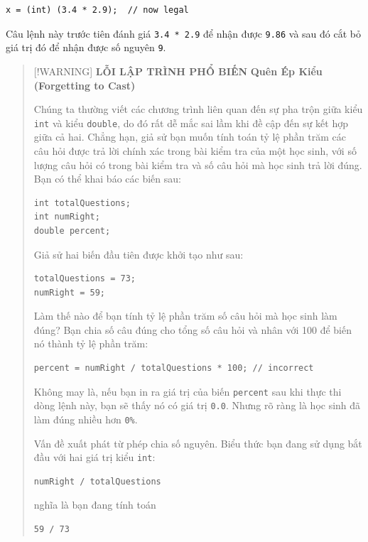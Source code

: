\begin{verbatim}
x = (int) (3.4 * 2.9);  // now legal
\end{verbatim}

Câu lệnh này trước tiên đánh giá \texttt{3.4\ *\ 2.9} để nhận được
\texttt{9.86} và sau đó cắt bỏ giá trị đó để nhận được số nguyên
\texttt{9}.

\begin{quote}
{[}!WARNING{]} \textbf{LỖI LẬP TRÌNH PHỔ BIẾN} \textbf{Quên Ép Kiểu
(Forgetting to Cast)}

Chúng ta thường viết các chương trình liên quan đến sự pha trộn giữa
kiểu \texttt{int} và kiểu \texttt{double}, do đó rất dễ mắc sai lầm khi
đề cập đến sự kết hợp giữa cả hai. Chẳng hạn, giả sử bạn muốn tính toán
tỷ lệ phần trăm các câu hỏi được trả lời chính xác trong bài kiểm tra
của một học sinh, với số lượng câu hỏi có trong bài kiểm tra và số câu
hỏi mà học sinh trả lời đúng. Bạn có thể khai báo các biến sau:

\begin{verbatim}
int totalQuestions;
int numRight;
double percent;
\end{verbatim}

Giả sử hai biến đầu tiên được khởi tạo như sau:

\begin{verbatim}
totalQuestions = 73;
numRight = 59;
\end{verbatim}

Làm thế nào để bạn tính tỷ lệ phần trăm số câu hỏi mà học sinh làm đúng?
Bạn chia số câu đúng cho tổng số câu hỏi và nhân với 100 để biến nó
thành tỷ lệ phần trăm:

\begin{verbatim}
percent = numRight / totalQuestions * 100; // incorrect
\end{verbatim}

Không may là, nếu bạn in ra giá trị của biến \texttt{percent} sau khi
thực thi dòng lệnh này, bạn sẽ thấy nó có giá trị \texttt{0.0}. Nhưng rõ
ràng là học sinh đã làm đúng nhiều hơn \texttt{0\%}.

Vấn đề xuất phát từ phép chia số nguyên. Biểu thức bạn đang sử dụng bắt
đầu với hai giá trị kiểu \texttt{int}:

\begin{verbatim}
numRight / totalQuestions
\end{verbatim}

nghĩa là bạn đang tính toán

\begin{verbatim}
59 / 73
\end{verbatim}


\end{quote}
